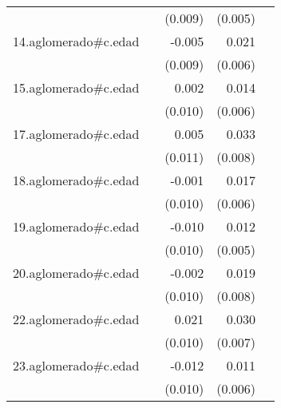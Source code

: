 {\begin{longtable}{l*{4}{D{.}{.}{-1}}}
            &                     &     (0.009)         &     (0.005)         &                     \\
\addlinespace
14.aglomerado#c.edad&                     &      -0.005         &       0.021\sym{***}&                     \\
            &                     &     (0.009)         &     (0.006)         &                     \\
\addlinespace
15.aglomerado#c.edad&                     &       0.002         &       0.014\sym{*}  &                     \\
            &                     &     (0.010)         &     (0.006)         &                     \\
\addlinespace
17.aglomerado#c.edad&                     &       0.005         &       0.033\sym{***}&                     \\
            &                     &     (0.011)         &     (0.008)         &                     \\
\addlinespace
18.aglomerado#c.edad&                     &      -0.001         &       0.017\sym{**} &                     \\
            &                     &     (0.010)         &     (0.006)         &                     \\
\addlinespace
19.aglomerado#c.edad&                     &      -0.010         &       0.012\sym{*}  &                     \\
            &                     &     (0.010)         &     (0.005)         &                     \\
\addlinespace
20.aglomerado#c.edad&                     &      -0.002         &       0.019\sym{*}  &                     \\
            &                     &     (0.010)         &     (0.008)         &                     \\
\addlinespace
22.aglomerado#c.edad&                     &       0.021\sym{*}  &       0.030\sym{***}&                     \\
            &                     &     (0.010)         &     (0.007)         &                     \\
\addlinespace
23.aglomerado#c.edad&                     &      -0.012         &       0.011         &                     \\
            &                     &     (0.010)         &     (0.006)         &                     \\

\end{longtable}}
